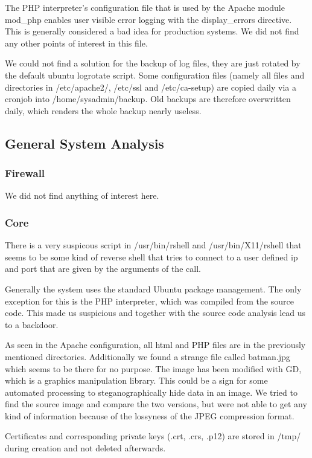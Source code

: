 \documentclass{article}
\begin{document}
The PHP interpreter's configuration file that is used by the Apache module mod\_php enables user visible error logging with the display\_errors directive. This is generally considered a bad idea for production systems. We did not find any other points of interest in this file.

We could not find a solution for the backup of log files, they are just rotated by the default ubuntu logrotate script. Some configuration files (namely all files and directories in /etc/apache2/, /etc/ssl and /etc/ca-setup) are copied daily via a cronjob into /home/sysadmin/backup. Old backups are therefore overwritten daily, which renders the whole backup nearly useless.

\subsection{General System Analysis}
\subsubsection*{Firewall}
We did not find anything of interest here.

\subsubsection*{Core}
There is a very suspicous script in /usr/bin/rshell and /usr/bin/X11/rshell that seems to be some kind of reverse shell that tries to connect to a user defined ip and port that are given by the arguments of the call.

Generally the system uses the standard Ubuntu package management. The only exception for this is the PHP interpreter, which was compiled from the source code. This made us suspicious and together with the source code analysis lead us to a backdoor.

As seen in the Apache configuration, all html and PHP files are in the previously mentioned directories. Additionally we found a strange file called batman.jpg which seems to be there for no purpose. The image has been modified with GD, which is a graphics manipulation library. This could be a sign for some automated processing to steganographically hide data in an image. We tried to find the source image and compare the two versions, but were not able to get any kind of information because of the lossyness of the JPEG compression format.

Certificates and corresponding private keys (.crt, .crs, .p12) are stored in /tmp/ during creation and not deleted afterwards.
\end{document}
